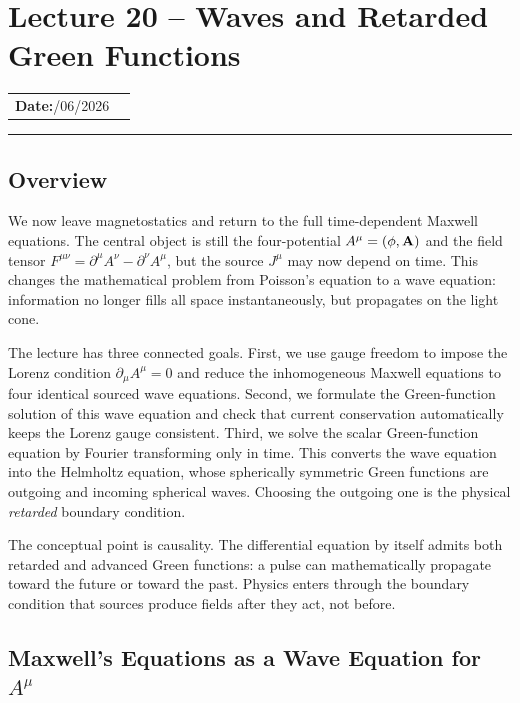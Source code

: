 \section{Lecture 20 -- Waves and Retarded Green Functions}\label{sec:lec20}

\begin{center}
\begin{tabular}{ll}
  \textbf{Date:}\quad 14/06/2026 & \\
\end{tabular}
\end{center}
\hrule\vspace{1.5em}

\subsection*{Overview}

We now leave magnetostatics and return to the full time-dependent Maxwell equations. The
central object is still the four-potential $A^\mu=(\phi,\mathbf{A})$ and the field tensor
$F^{\mu\nu}=\partial^\mu A^\nu-\partial^\nu A^\mu$, but the source $J^\mu$ may now depend
on time. This changes the mathematical problem from Poisson's equation to a wave equation:
information no longer fills all space instantaneously, but propagates on the light cone.

The lecture has three connected goals. First, we use gauge freedom to impose the Lorenz
condition $\partial_\mu A^\mu=0$ and reduce the inhomogeneous Maxwell equations to four
identical sourced wave equations. Second, we formulate the Green-function solution of this
wave equation and check that current conservation automatically keeps the Lorenz gauge
consistent. Third, we solve the scalar Green-function equation by Fourier transforming only
in time. This converts the wave equation into the Helmholtz equation, whose spherically
symmetric Green functions are outgoing and incoming spherical waves. Choosing the outgoing
one is the physical 
\emph{retarded} boundary condition.

The conceptual point is causality. The differential equation by itself admits both
retarded and advanced Green functions: a pulse can mathematically propagate toward the
future or toward the past. Physics enters through the boundary condition that sources
produce fields after they act, not before.

\subsection{Maxwell's Equations as a Wave Equation for $A^\mu$}\label{subsec:lec20-maxwell-wave}


